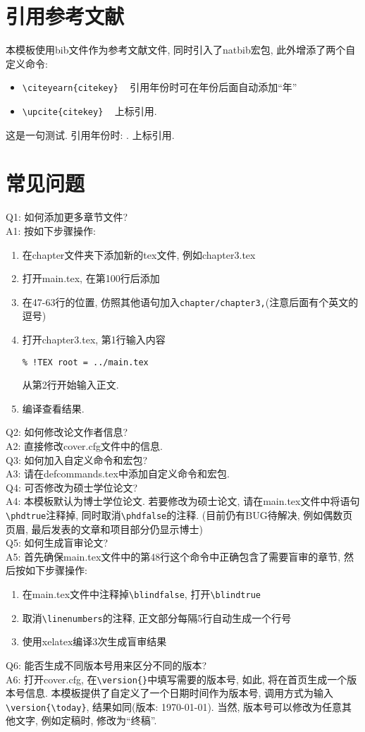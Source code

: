 \section{引用参考文献}
本模板使用bib文件作为参考文献文件, 同时引入了natbib宏包, 此外增添了两个自定义命令:
\begin{itemize}
\item \verb|\citeyearn{citekey}|  ~  引用年份时可在年份后面自动添加``年''
\item \verb|\upcite{citekey}| ~ 上标引用.
\end{itemize}

这是一句测试\cite{Hazay_2010_Efficient}. 引用年份时: . 上标引用.

\section{常见问题}
Q1: 如何添加更多章节文件?\\
A1: 按如下步骤操作:
\begin{enumerate}
\item 在chapter文件夹下添加新的tex文件, 例如chapter3.tex
\item 打开main.tex, 在第100行后添加\verb||
\item 在47-63行的位置, 仿照其他语句加入\verb|chapter/chapter3,|(注意后面有个英文的逗号)
\item 打开chapter3.tex, 第1行输入内容
\begin{verbatim}
% !TEX root = ../main.tex
\end{verbatim}
从第2行开始输入正文.
\item 编译查看结果.
\end{enumerate}

Q2: 如何修改论文作者信息?\\
A2: 直接修改cover.cfg文件中的信息.\\

Q3: 如何加入自定义命令和宏包?\\
A3: 请在defcommands.tex中添加自定义命令和宏包.\\

Q4: 可否修改为硕士学位论文?\\
A4: 本模板默认为博士学位论文. 若要修改为硕士论文, 请在main.tex文件中将语句\verb|\phdtrue|注释掉, 同时取消\verb|\phdfalse|的注释. (目前仍有BUG待解决, 例如偶数页页眉, 最后发表的文章和项目部分仍显示博士)\\

Q5: 如何生成盲审论文?\\
A5: 首先确保main.tex文件中的第48行这个\verb||命令中正确包含了需要盲审的章节, 然后按如下步骤操作:
\begin{enumerate}
\item 在main.tex文件中注释掉\verb|\blindfalse|, 打开\verb|\blindtrue|
\item 取消\verb|\linenumbers|的注释, 正文部分每隔5行自动生成一个行号
\item 使用xelatex编译3次生成盲审结果
\end{enumerate}

Q6: 能否生成不同版本号用来区分不同的版本?\\
A6: 打开cover.cfg, 在\verb|\version{}|中填写需要的版本号, 如此, 将在首页生成一个版本号信息. 本模板提供了自定义了一个日期时间作为版本号, 调用方式为输入\verb|\version{\today}|, 结果如同(版本: \today). 当然, 版本号可以修改为任意其他文字, 例如定稿时, 修改为``终稿''.
